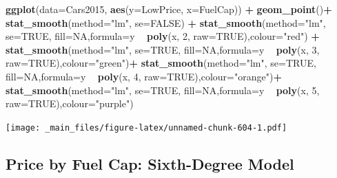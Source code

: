 \documentclass[]{book}
\newenvironment{Shaded}{\begin{snugshade}}{\end{snugshade}}
\newcommand{\KeywordTok}[1]{\textcolor[rgb]{0.13,0.29,0.53}{\textbf{#1}}}
\newcommand{\DataTypeTok}[1]{\textcolor[rgb]{0.13,0.29,0.53}{#1}}
\newcommand{\DecValTok}[1]{\textcolor[rgb]{0.00,0.00,0.81}{#1}}
\newcommand{\StringTok}[1]{\textcolor[rgb]{0.31,0.60,0.02}{#1}}
\newcommand{\OtherTok}[1]{\textcolor[rgb]{0.56,0.35,0.01}{#1}}
\newcommand{\OperatorTok}[1]{\textcolor[rgb]{0.81,0.36,0.00}{\textbf{#1}}}
\newcommand{\NormalTok}[1]{#1}
\begin{document}
\begin{Shaded}
\begin{Highlighting}[]
\KeywordTok{ggplot}\NormalTok{(}\DataTypeTok{data=}\NormalTok{Cars2015, }\KeywordTok{aes}\NormalTok{(}\DataTypeTok{y=}\NormalTok{LowPrice, }\DataTypeTok{x=}\NormalTok{FuelCap)) }\OperatorTok{+}\StringTok{ }\KeywordTok{geom_point}\NormalTok{()}\OperatorTok{+}\StringTok{ }\KeywordTok{stat_smooth}\NormalTok{(}\DataTypeTok{method=}\StringTok{"lm"}\NormalTok{, }\DataTypeTok{se=}\OtherTok{FALSE}\NormalTok{) }\OperatorTok{+}\StringTok{ }\KeywordTok{stat_smooth}\NormalTok{(}\DataTypeTok{method=}\StringTok{"lm"}\NormalTok{, }\DataTypeTok{se=}\OtherTok{TRUE}\NormalTok{, }\DataTypeTok{fill=}\OtherTok{NA}\NormalTok{,}\DataTypeTok{formula=}\NormalTok{y }\OperatorTok{~}\StringTok{ }\KeywordTok{poly}\NormalTok{(x, }\DecValTok{2}\NormalTok{, }\DataTypeTok{raw=}\OtherTok{TRUE}\NormalTok{),}\DataTypeTok{colour=}\StringTok{"red"}\NormalTok{) }\OperatorTok{+}\StringTok{ }
\StringTok{  }\KeywordTok{stat_smooth}\NormalTok{(}\DataTypeTok{method=}\StringTok{"lm"}\NormalTok{, }\DataTypeTok{se=}\OtherTok{TRUE}\NormalTok{, }\DataTypeTok{fill=}\OtherTok{NA}\NormalTok{,}\DataTypeTok{formula=}\NormalTok{y }\OperatorTok{~}\StringTok{ }\KeywordTok{poly}\NormalTok{(x, }\DecValTok{3}\NormalTok{, }\DataTypeTok{raw=}\OtherTok{TRUE}\NormalTok{),}\DataTypeTok{colour=}\StringTok{"green"}\NormalTok{)}\OperatorTok{+}\StringTok{ }
\StringTok{  }\KeywordTok{stat_smooth}\NormalTok{(}\DataTypeTok{method=}\StringTok{"lm"}\NormalTok{, }\DataTypeTok{se=}\OtherTok{TRUE}\NormalTok{, }\DataTypeTok{fill=}\OtherTok{NA}\NormalTok{,}\DataTypeTok{formula=}\NormalTok{y }\OperatorTok{~}\StringTok{ }\KeywordTok{poly}\NormalTok{(x, }\DecValTok{4}\NormalTok{, }\DataTypeTok{raw=}\OtherTok{TRUE}\NormalTok{),}\DataTypeTok{colour=}\StringTok{"orange"}\NormalTok{)}\OperatorTok{+}\StringTok{ }
\StringTok{  }\KeywordTok{stat_smooth}\NormalTok{(}\DataTypeTok{method=}\StringTok{"lm"}\NormalTok{, }\DataTypeTok{se=}\OtherTok{TRUE}\NormalTok{, }\DataTypeTok{fill=}\OtherTok{NA}\NormalTok{,}\DataTypeTok{formula=}\NormalTok{y }\OperatorTok{~}\StringTok{ }\KeywordTok{poly}\NormalTok{(x, }\DecValTok{5}\NormalTok{, }\DataTypeTok{raw=}\OtherTok{TRUE}\NormalTok{),}\DataTypeTok{colour=}\StringTok{"purple"}\NormalTok{)}
\end{Highlighting}
\end{Shaded}

\texttt{[image: \_main\_files/figure-latex/unnamed-chunk-604-1.pdf]}

\subsection{Price by Fuel Cap: Sixth-Degree
Model}\label{price-by-fuel-cap-sixth-degree-model}
\end{document}
